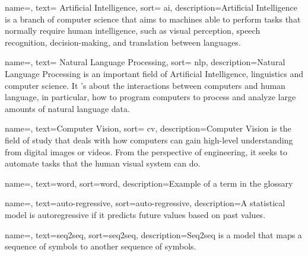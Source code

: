 \renewcommand{\acronymname}{Acronimi e abbreviazioni}

{
    name=,
    text= Artificial Intelligence,
    sort= ai,
    description={Artificial Intelligence is a branch of computer science that aims to machines able to perform tasks that normally require human intelligence, such as visual perception, speech recognition, decision-making, and translation between languages.}
}


{
    name=,
    text= Natural Language Processing,
    sort= nlp,
    description={Natural Language Processing is an important field of Artificial Intelligence, linguistics and computer science. It 's about the interactions between computers and human language, in particular, how to program computers to process and analyze large amounts of natural language data.}
}

{
    name=,
    text=Computer Vision,
    sort= cv,
    description={Computer Vision is the field of study that deals with how computers can gain high-level understanding from digital images or videos. From the perspective of engineering, it seeks to automate tasks that the human visual system can do.}
}





{
    name=,
    text=word,
    sort=word,
    description={Example of a term in the glossary}
}

{
    name=,
    text=auto-regressive,
    sort=auto-regressive,
    description={A statistical  model is autoregressive if it predicts future values based on past values.}
}

{
    name=,
    text=seq2seq,
    sort=seq2seq,
    description={Seq2seq is a model that maps a sequence of symbols to another sequence of symbols.}
}


